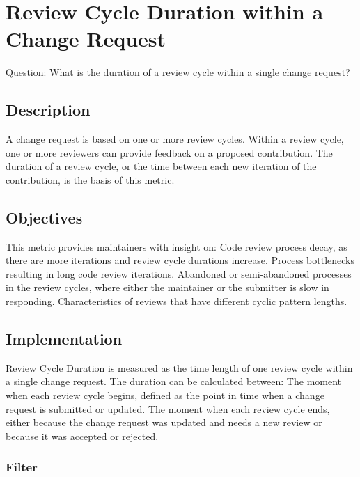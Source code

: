 \hypertarget{review-cycle-duration-within-a-change-request}{%
\section{Review Cycle Duration within a Change
Request}\label{review-cycle-duration-within-a-change-request}}

Question: What is the duration of a review cycle within a single change
request?

\hypertarget{description}{%
\subsection{Description}\label{description}}

A change request is based on one or more review cycles. Within a review
cycle, one or more reviewers can provide feedback on a proposed
contribution. The duration of a review cycle, or the time between each
new iteration of the contribution, is the basis of this metric.

\hypertarget{objectives}{%
\subsection{Objectives}\label{objectives}}

This metric provides maintainers with insight on: Code review process
decay, as there are more iterations and review cycle durations increase.
Process bottlenecks resulting in long code review iterations. Abandoned
or semi-abandoned processes in the review cycles, where either the
maintainer or the submitter is slow in responding. Characteristics of
reviews that have different cyclic pattern lengths.

\hypertarget{implementation}{%
\subsection{Implementation}\label{implementation}}

Review Cycle Duration is measured as the time length of one review cycle
within a single change request. The duration can be calculated between:
The moment when each review cycle begins, defined as the point in time
when a change request is submitted or updated. The moment when each
review cycle ends, either because the change request was updated and
needs a new review or because it was accepted or rejected.

\hypertarget{filter}{%
\subsubsection{Filter}\label{filter}}

